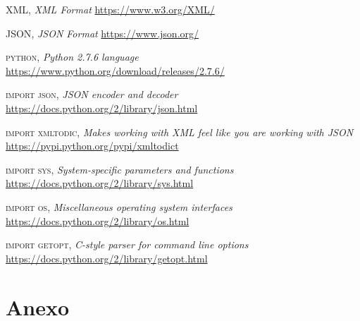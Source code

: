 \documentclass[a4paper,11pt]{book}
\begin{document}
\begin{thebibliography}{aaaa}


 \textsc{XML},
\textit{XML Format}
\url{https://www.w3.org/XML/} 


 \textsc{JSON},
\textit{JSON Format}
\url{https://www.json.org/} 


 \textsc{python},
\textit{Python 2.7.6 language}
\url{https://www.python.org/download/releases/2.7.6/} 


 \textsc{import json},
\textit{JSON encoder and decoder}
\url{https://docs.python.org/2/library/json.html} 

 \textsc{import xmltodic},
\textit{Makes working with XML feel like you are working with JSON}
\url{https://pypi.python.org/pypi/xmltodict} 

 \textsc{import sys},
\textit{System-specific parameters and functions}
\url{https://docs.python.org/2/library/sys.html} 

 \textsc{import os},
\textit{Miscellaneous operating system interfaces}
\url{https://docs.python.org/2/library/os.html} 

 \textsc{import getopt},
\textit{C-style parser for command line options}
\url{https://docs.python.org/2/library/getopt.html}


\end{thebibliography}
 

\chapter{Anexo}
\end{document}
